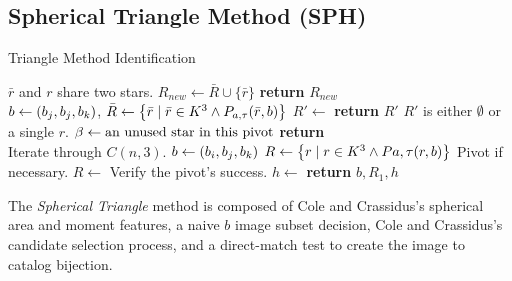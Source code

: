 \subsection{Spherical Triangle Method (SPH)}\label{subsec:sphericalTriangleMethod}
\begin{algorithm}
    \caption{Triangle Method Identification} \label{algorithm:triangleIdentification}
    \begin{algorithmic}[1]
        \LineComment $\bar{r}$ and $r$ share two stars.
        \State $R_{new} \gets \bar{R} \cup \{\bar{r}\}$
        \EndIf
        \EndFor
        \State \textbf{return} $R_{new}$
        \EndFunction
        \\
        \State $b \gets (b_j, b_j, b_k)$, $\bar{R} \gets \left\{  \bar{r} \mid \bar{r} \in K^3
        \land P_{a, \tau}(\bar{r}, b)  \right\}$
        \State $R' \gets $ 
        \State \textbf{return} $R'$ \Comment $R'$ is either $\emptyset$ or a single $r$.
        \Else
        \State $\beta \gets \text{an unused star in this pivot}$
        \State \textbf{return} 
        \EndIf
        \EndFunction
        \\
          \Comment Iterate through $C(n, 3)$.
        \State $b \gets \left(b_i, b_j, b_k\right)$
        \State $R \gets \left\{  r \mid r \in K^3
        \land P{a, \tau}(r, b)  \right\}$
         \Comment Pivot if necessary.
        \State $R \gets $ 
        \EndIf
         \Comment Verify the pivot's success.
        \State $h \gets $ 
        \invalidBijection
        \State \textbf{return} $b, R_1, h$
        \EndIf
        \EndIf
        \EndFor
        \EndFor
        \EndFor
        \EndFunction
    \end{algorithmic}
\end{algorithm}

The \textit{Spherical Triangle} method is composed of Cole and Crassidus's spherical area and moment features, a
naive $b$ image subset decision, Cole and Crassidus's candidate selection process, and a direct-match test to create
the image to catalog bijection.

